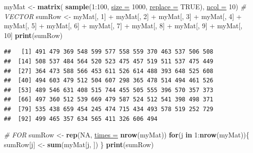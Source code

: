 \documentclass[twoside,symmetric]{book}
\newenvironment{Shaded}{}{}
\newcommand{\CommentTok}[1]{\textit{#1}}
\newcommand{\ControlFlowTok}[1]{\textbf{#1}}
\newcommand{\DataTypeTok}[1]{\underline{#1}}
\newcommand{\DecValTok}[1]{#1}
\newcommand{\KeywordTok}[1]{\textbf{#1}}
\newcommand{\NormalTok}[1]{#1}
\newcommand{\OperatorTok}[1]{#1}
\newcommand{\OtherTok}[1]{#1}
\newcommand{\StringTok}[1]{#1}
\begin{document}
\begin{Shaded}
\begin{Highlighting}[]
\NormalTok{myMat <-}\StringTok{ }\KeywordTok{matrix}\NormalTok{(}
  \KeywordTok{sample}\NormalTok{(}\DecValTok{1}\OperatorTok{:}\DecValTok{100}\NormalTok{, }\DataTypeTok{size =} \DecValTok{1000}\NormalTok{, }\DataTypeTok{replace =} \OtherTok{TRUE}\NormalTok{), }
  \DataTypeTok{ncol =} \DecValTok{10}\NormalTok{)}
\CommentTok{# VECTOR}
\NormalTok{sumRow <-}\StringTok{ }\NormalTok{myMat[, }\DecValTok{1}\NormalTok{] }\OperatorTok{+}\StringTok{ }\NormalTok{myMat[, }\DecValTok{2}\NormalTok{] }\OperatorTok{+}\StringTok{ }\NormalTok{myMat[, }\DecValTok{3}\NormalTok{] }\OperatorTok{+}\StringTok{ }\NormalTok{myMat[, }\DecValTok{4}\NormalTok{] }\OperatorTok{+}\StringTok{ }
\StringTok{  }\NormalTok{myMat[, }\DecValTok{5}\NormalTok{] }\OperatorTok{+}\StringTok{ }\NormalTok{myMat[, }\DecValTok{6}\NormalTok{] }\OperatorTok{+}\StringTok{ }\NormalTok{myMat[, }\DecValTok{7}\NormalTok{] }\OperatorTok{+}\StringTok{ }\NormalTok{myMat[, }\DecValTok{8}\NormalTok{] }\OperatorTok{+}\StringTok{ }
\StringTok{  }\NormalTok{myMat[, }\DecValTok{9}\NormalTok{] }\OperatorTok{+}\StringTok{ }\NormalTok{myMat[, }\DecValTok{10}\NormalTok{]}
\KeywordTok{print}\NormalTok{(sumRow)}
\end{Highlighting}
\end{Shaded}

\begin{verbatim}
##   [1] 491 479 369 548 599 577 558 559 370 463 537 506 508
##  [14] 508 537 484 564 520 523 475 457 519 511 537 475 449
##  [27] 364 473 588 566 453 611 526 614 488 393 648 525 608
##  [40] 494 603 479 512 504 607 298 365 478 514 494 461 526
##  [53] 489 546 631 408 515 744 455 505 555 396 570 357 373
##  [66] 497 360 512 539 669 479 587 524 512 541 398 498 371
##  [79] 535 438 659 454 245 474 715 434 493 578 519 252 729
##  [92] 499 465 357 634 565 411 326 606 494
\end{verbatim}

\begin{Shaded}
\begin{Highlighting}[]
\CommentTok{# FOR}
\NormalTok{sumRow <-}\StringTok{ }\KeywordTok{rep}\NormalTok{(}\OtherTok{NA}\NormalTok{, }\DataTypeTok{times =} \KeywordTok{nrow}\NormalTok{(myMat))}
\ControlFlowTok{for}\NormalTok{(j }\ControlFlowTok{in} \DecValTok{1}\OperatorTok{:}\KeywordTok{nrow}\NormalTok{(myMat))\{}
\NormalTok{  sumRow[j] <-}\StringTok{ }\KeywordTok{sum}\NormalTok{(myMat[j, ])}
\NormalTok{\}}
\KeywordTok{print}\NormalTok{(sumRow)}
\end{Highlighting}
\end{Shaded}
\end{document}
